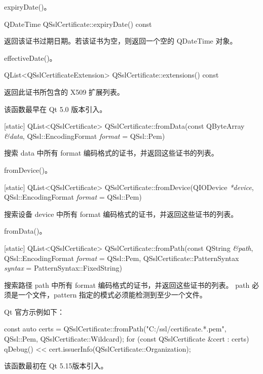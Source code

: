 \begin{seeAlso}
expiryDate()。
\end{seeAlso}

QDateTime QSslCertificate::expiryDate() const

返回该证书过期日期。若该证书为空，则返回一个空的 QDateTime 对象。

\begin{seeAlso}
effectiveDate()。
\end{seeAlso}

QList<QSslCertificateExtension> QSslCertificate::extensions() const

返回此证书所包含的 X509 扩展列表。

该函数最早在 Qt 5.0 版本引入。

[static] QList<QSslCertificate> QSslCertificate::fromData(const QByteArray \emph{\&data},
QSsl::EncodingFormat \emph{format} = QSsl::Pem)

搜索 data 中所有 format 编码格式的证书，并返回这些证书的列表。

\begin{seeAlso}
fromDevice()。
\end{seeAlso}

[static] QList<QSslCertificate> QSslCertificate::fromDevice(QIODevice \emph{*device}, 
QSsl::EncodingFormat \emph{format} = QSsl::Pem)

搜索设备 device 中所有 format 编码格式的证书，并返回这些证书的列表。

\begin{seeAlso}
fromData()。
\end{seeAlso}

[static] QList<QSslCertificate> QSslCertificate::fromPath(const QString \emph{\&path}, 
QSsl::EncodingFormat \emph{format} = QSsl::Pem, 
QSslCertificate::PatternSyntax \emph{syntax} = PatternSyntax::FixedString)

搜索路径 path 中所有 format 编码格式的证书，并返回这些证书的列表。 
path 必须是一个文件，pattern 指定的模式必须能检测到至少一个文件。

Qt 官方示例如下：

\begin{cppcode}
const auto certs = QSslCertificate::fromPath("C:/ssl/certificate.*.pem",
                                              QSsl::Pem, QSslCertificate::Wildcard);
for (const QSslCertificate &cert : certs) {
    qDebug() << cert.issuerInfo(QSslCertificate::Organization);
}
\end{cppcode}

该函数最初在 Qt 5.15版本引入。

